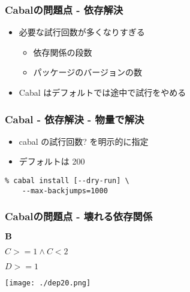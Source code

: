 \documentclass[cjk,dvipdfm,14pt]{beamer}
\begin{document}
\begin{frame}

\frametitle{Cabalの問題点 - 依存解決}

\begin{itemize}
\item 必要な試行回数が多くなりすぎる
  \begin{itemize}
  \item 依存関係の段数
  \item パッケージのバージョンの数
  \end{itemize}
\item Cabal はデフォルトでは途中で試行をやめる
\end{itemize}

\end{frame}

\begin{frame}[fragile]
\frametitle{Cabal - 依存解決 - 物量で解決}

\begin{itemize}
\item cabal の試行回数? を明示的に指定
\item デフォルトは 200
\end{itemize}

\begin{lstlisting}
% cabal install [--dry-run] \
    --max-backjumps=1000
\end{lstlisting}

\end{frame}


\begin{frame}
\frametitle{Cabalの問題点 - 壊れる依存関係}

\begin{description}
\item ${\bf B}$
\item
  \begin{description}
  \item $C >= 1 \wedge C < 2$
  \item $D >= 1$
  \end{description}
\end{description}

\texttt{[image: ./dep20.png]}

\end{frame}
\end{document}
